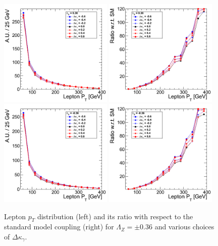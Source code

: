 \begin{figure}[h!t]
  {\centering
    \includegraphics[width=0.48\textwidth]{figs/LeptonpT_036.png}
    \includegraphics[width=0.48\textwidth]{figs/LeptonpT_036_ratio.png}
    \includegraphics[width=0.48\textwidth]{figs/LeptonpT_m036.png}
    \includegraphics[width=0.48\textwidth]{figs/LeptonpT_m036_ratio.png}
    \caption{Lepton $p_T$ distribution (left) and its ratio with respect to 
    the standard model coupling (right) for $\Lambda_Z = \pm 0.36$ and various choices of $\Delta{\kappa_\gamma}$.}
    \label{fig:ww_LeptonpT_atgcRatio036}}
\end{figure}
